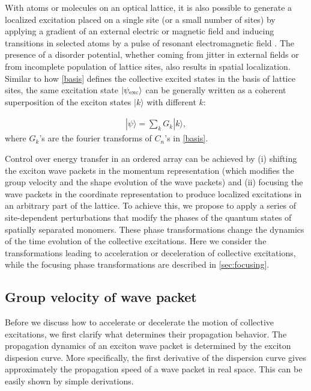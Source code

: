 With atoms or molecules on an optical lattice, it is also possible to generate a localized excitation placed on a single site
 (or a small number of sites) by applying a gradient of an external electric or magnetic field and inducing transitions in
 selected atoms by a pulse of resonant electromagnetic field \cite{demille}. The presence of a disorder potential, 
whether coming from jitter in external fields or from incomplete population of lattice sites,  also results in spatial 
localization. Similar to how \autoref{basis} defines the collective excited states in the basis of lattice sites, 
the same excitation state $|\psi_{\rm exc}\rangle$ can be generally written as a coherent superposition of the exciton states
 $|k\rangle$ with different $k$:

\begin{eqnarray}
| \psi \rangle = \sum_{k} G_k | k \rangle ,
\label{k-rep}
\end{eqnarray}
where $G_k$'s are the fourier transforms of $C_n$'s in \autoref{basis}. 

Control over energy transfer in an ordered array can be achieved
by (i) shifting the exciton wave packets in the momentum
representation (which modifies the group velocity and the shape
evolution of the wave packets) and (ii) focusing the wave packets
in the coordinate representation to produce localized excitations
in an arbitrary part of the lattice. To achieve this, we propose
to apply a series of site-dependent perturbations  that modify the phases of the quantum states of spatially separated monomers. 
These phase transformations change the dynamics of the time evolution of the collective excitations. 
Here we consider the transformations leading to acceleration or deceleration of collective excitations, while   
 the focusing phase transformations are described in \autoref{sec:focusing}. 

\subsection{Group velocity of wave packet}
\label{sec:groupVelocity} 

Before we discuss how to accelerate or decelerate the motion of collective excitations, we first clarify
what determines their propagation behavior.  The propagation dynamics of an exciton wave packet is determined by 
the exciton dispesion curve. More specifically, the first derivative of the dispersion curve
gives approximately the propagation speed of a wave packet in real space. This can be easily shown by  simple derivations. 

